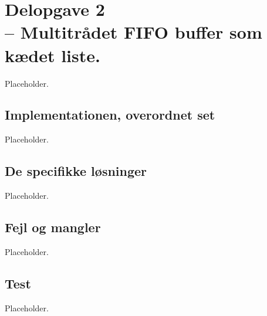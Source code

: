 \documentclass[main.tex]{subfile}
\begin{document}
\section{Delopgave 2\\\normalsize{-- Multitrådet FIFO buffer som kædet liste.}}
Placeholder.\\

\subsection{Implementationen, overordnet set}
Placeholder.\\

\subsection{De specifikke løsninger}
Placeholder.\\

\subsection{Fejl og mangler}
Placeholder.\\

\subsection{Test}
Placeholder.\\
\end{document}
